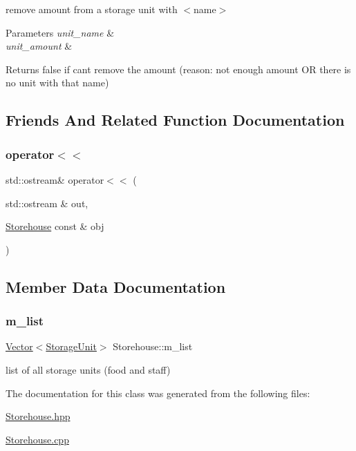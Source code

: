 remove amount from a storage unit with $<$name$>$ 
\begin{DoxyParams}{Parameters}
{\em unit\+\_\+name} & \\
\hline
{\em unit\+\_\+amount} & \\
\hline
\end{DoxyParams}
\begin{DoxyReturn}{Returns}
false if can\textquotesingle{}t remove the amount (reason\+: not enough amount OR there is no unit with that name) 
\end{DoxyReturn}


\subsection{Friends And Related Function Documentation}
\mbox{\label{classStorehouse_a2849e8095f3745a8766e4d3f7f0fba1f}} 
\subsubsection{\texorpdfstring{operator$<$$<$}{operator<<}}
{\footnotesize\ttfamily std\+::ostream\& operator$<$$<$ (\begin{DoxyParamCaption}\item[{std\+::ostream \&}]{out,  }\item[{\hyperlink{classStorehouse}{Storehouse} const \&}]{obj }\end{DoxyParamCaption})\hspace{0.3cm}{\ttfamily [friend]}}



\subsection{Member Data Documentation}
\mbox{\label{classStorehouse_aa5d81c208f66eb440d807aa9a769a2fd}} 
\subsubsection{\texorpdfstring{m\+\_\+list}{m\_list}}
{\footnotesize\ttfamily \hyperlink{classVector}{Vector}$<$\hyperlink{classStorageUnit}{Storage\+Unit}$>$ Storehouse\+::m\+\_\+list\hspace{0.3cm}{\ttfamily [private]}}



list of all storage units (food and staff) 



The documentation for this class was generated from the following files\+:\begin{DoxyCompactItemize}
\item 
\hyperlink{Storehouse_8hpp}{Storehouse.\+hpp}\item 
\hyperlink{Storehouse_8cpp}{Storehouse.\+cpp}\end{DoxyCompactItemize}
